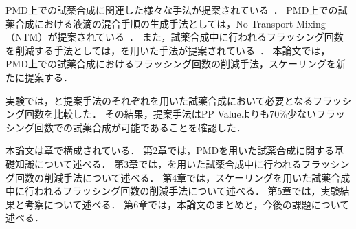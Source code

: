     PMD上での試薬合成に関連した様々な手法が提案されている~\cite{bhattacharjee2022algorithms}．
    PMD上での試薬合成における液滴の混合手順の生成手法としては，No Transport Mixing（NTM）が提案されている~\cite{4}．
    また，試薬合成中に行われるフラッシング回数を削減する手法としては，を用いた手法が提案されている~\cite{10089903}．
    本論文では，PMD上での試薬合成におけるフラッシング回数の削減手法，スケーリングを新たに提案する．

    実験では，と提案手法のそれぞれを用いた試薬合成において必要となるフラッシング回数を比較した．
    その結果，提案手法はPP Valueよりも70\%少ないフラッシング回数での試薬合成が可能であることを確認した．
    
    本論文は章で構成されている．
    第2章では，PMDを用いた試薬合成に関する基礎知識について述べる．
    第3章では，を用いた試薬合成中に行われるフラッシング回数の削減手法について述べる．
    第4章では，スケーリングを用いた試薬合成中に行われるフラッシング回数の削減手法について述べる．
    第5章では，実験結果と考察について述べる．
    第6章では，本論文のまとめと，今後の課題について述べる．


